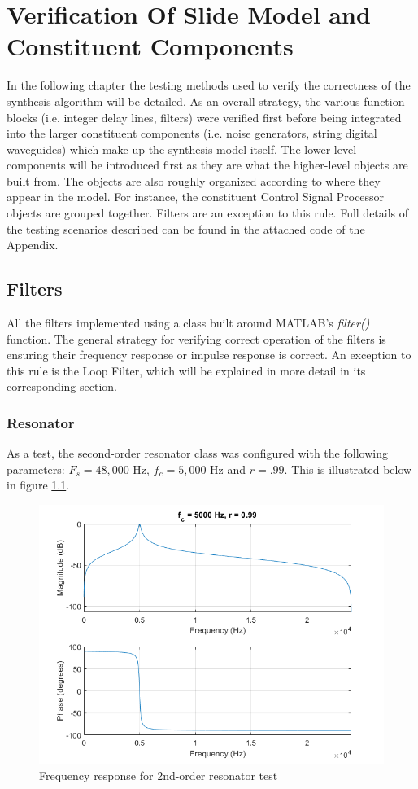 \documentclass[../main.tex]{subfiles}
\begin{document}
\chapter{Verification Of Slide Model and Constituent Components}

In the following chapter the testing methods used to verify the correctness of the synthesis algorithm will be detailed. As an overall strategy, the various function blocks (i.e. integer delay lines, filters) were verified first before being integrated into the larger constituent components (i.e. noise generators, string digital waveguides) which make up the synthesis model itself. The lower-level components will be introduced first as they are what the higher-level objects are built from. The objects are also roughly organized according to where they appear in the model. For instance, the constituent Control Signal Processor objects are grouped together. Filters are an exception to this rule. Full details of the testing scenarios described can be found in the attached code of the Appendix.

\section{Filters}
All the filters implemented using a class built around MATLAB's \emph{filter()} function. The general strategy for verifying correct operation of the filters is ensuring their frequency response or impulse response is correct. An exception to this rule is the Loop Filter, which will be explained in more detail in its corresponding section.

\subsection{Resonator}
As a test, the second-order resonator class was configured with the following parameters: $F_s = 48,000 \text{ Hz}$, $f_c = 5,000 \text{ Hz}$ and $r = .99$. This is illustrated below in figure \ref{fig:ResoTest}.

\begin{figure}[h]
    \centering
    \includegraphics[scale=.65]{./images/plots/ResonatorTest.png}
    \caption{Frequency response for 2nd-order resonator test}
    \label{fig:ResoTest}
\end{figure}
\end{document}
